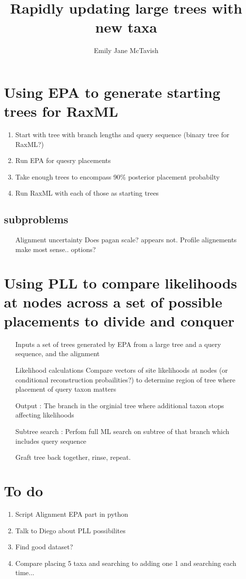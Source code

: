 \documentclass[a4paper,10pt]{article}
\title{Rapidly updating large trees with new taxa}
\author{Emily Jane McTavish}
\begin{document}
\maketitle

\section{Using EPA to generate starting trees for RaxML}

\begin{enumerate}
 \item Start with tree with branch lengths and query sequence (binary tree for RaxML?)
 \item Run EPA for quesry placements
 \item Take enough trees to encompass 90\% posterior placement probabilty 
 \item Run RaxML with each of those as starting trees
\end{enumerate}

\subsection{subproblems}
\begin{enumerate}
 \item[] Alignment uncertainty Does pagan scale? appears not. Profile alignements make most sense.. options?
\end{enumerate}


\section{Using PLL to compare likelihoods at nodes across a set of possible placements to divide and conquer}
\begin{enumerate}
 \item[Inputs] a set of trees generated by EPA from a large tree and a query sequence, and the alignment
 \item[Likelihood calculations] Compare vectors of site likelihoods at nodes (or conditional reconstruction probailities?) to determine region of tree where placement of query taxon matters
 \item[] Output : The branch in the orginial tree where additional taxon stops affecting likelihoods
 \item[] Subtree search : Perfom full ML search on subtree of that branch which includes query sequence
 \item[] Graft tree back together, rinse, repeat.
\end{enumerate}

\section{To do}
\begin{enumerate}
 \item Script Alignment EPA part in python
 \item Talk to Diego about PLL possibilites
 \item Find good dataset?
 \item Compare placing 5 taxa and searching to adding one 1 and searching each time...
\end{enumerate}
\end{document}
